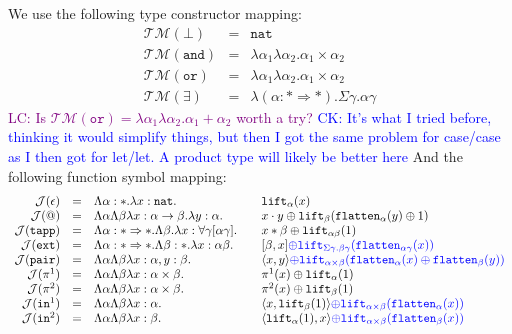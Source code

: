 \documentclass[runningheads,a4paper]{llncs}
\newcommand{\Typemap}{\mathcal{T\!M}}
\newcommand{\Termmap}{\mathcal{J}}
\newcommand{\quant}[2]{\forall #1[#2]}
\newcommand{\arrtype}{\rightarrow}
\newcommand{\arrkind}{\Rightarrow}
\newcommand{\pair}[2]{\langle #1,#2 \rangle}
\newcommand{\expair}[2]{[#1,#2]}
\newcommand{\nat}{\mathtt{nat}}
\newcommand{\flatten}{\mathtt{flatten}}
\newcommand{\lift}{\mathtt{lift}}
\newcommand{\CK}[1]{\textcolor{blue}{CK: #1}}
\newcommand{\CKchange}[1]{\textcolor{blue}{#1}}
\newcommand{\LC}[1]{\textcolor{purple}{LC: #1}}
\begin{document}
We use the following type constructor mapping:
\[
\begin{array}{rcl}
\Typemap(\bot) & = & \nat \\
\Typemap(\mathtt{and}) & = & \lambda\alpha_1\lambda\alpha_2 . \alpha_1\times\alpha_2 \\
\Typemap(\mathtt{or}) & = & \lambda\alpha_1\lambda\alpha_2 . \alpha_1\times\alpha_2 \\
\Typemap(\exists) & = & \lambda(\alpha : * \arrkind *) . \Sigma \gamma . \alpha \gamma
\end{array}
\]
\LC{Is $\Typemap(\mathtt{or}) = \lambda\alpha_1\lambda\alpha_2 . \alpha_1+\alpha_2$ worth a try?}
\CK{It's what I tried before, thinking it would simplify things, but
  then I got the same problem for case/case as I then got for let/let.
  A product type will likely be better here}
And the following function symbol mapping:
\[
\begin{array}{rcll}
\Termmap(\epsilon) & = & \Lambda \alpha:* . \lambda x:\nat. &
  \mathtt{lift}_\alpha(x) \\
\Termmap(@) & = & \Lambda\alpha\Lambda\beta\lambda x: \alpha \arrtype \beta . \lambda y :
  \alpha . \quad & x \cdot y \oplus \lift_\beta(\flatten_\alpha(
  y) \oplus 1) \\
\Termmap(\mathtt{tapp}) & = & \Lambda \alpha : * \arrkind * . \Lambda \beta . \lambda x : \quant{\gamma}{\alpha\gamma} . \quad & x * \beta \oplus \lift_{\alpha\beta}(1) \\
\Termmap(\mathtt{ext}) & = & \Lambda \alpha : * \arrkind * . \Lambda \beta : * . \lambda x:\alpha\beta . &
  \expair{\beta}{x} \CKchange{\oplus \lift_{\Sigma\gamma.\beta\gamma}(
  \flatten_{\alpha\gamma}(x))} \\
\Termmap(\mathtt{pair}) & = & \Lambda \alpha \Lambda \beta \lambda x :
  \alpha, y : \beta.\quad & \pair{x}{y} \CKchange{\oplus \lift_{
  \alpha \times \beta}(\flatten_\alpha(x) \oplus \flatten_{\beta}(y))} \\
\Termmap(\pi^1) & = & \Lambda \alpha \Lambda \beta \lambda x :
  \alpha \times \beta . \quad
  & \pi^1(x) \oplus \lift_{\alpha}(1) \\
\Termmap(\pi^2) & = & \Lambda \alpha \Lambda \beta \lambda x :
  \alpha\times\beta.\quad
  & \pi^2(x) \oplus \lift_{\beta}(1) \\
\Termmap(\mathtt{in}^1) & = & \Lambda \alpha \Lambda \beta
  \lambda x : \alpha.\quad & \pair{x}{\lift_\beta(1)}
  \CKchange{\oplus \lift_{\alpha
  \times \beta}(\flatten_{\alpha}(x))} \\
\Termmap(\mathtt{in}^2) & = & \Lambda \alpha \Lambda \beta
  \lambda x : \beta.\quad & \pair{\lift_\alpha(1)}{x}
  \CKchange{\oplus \lift_{\alpha \times \beta}(\flatten_{\beta}(x))} \\
\end{array}
\]
\end{document}
